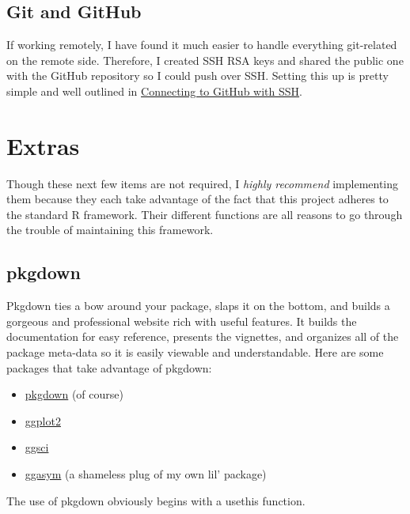 \documentclass[]{book}
\newenvironment{Shaded}{\begin{snugshade}}{\end{snugshade}}
\newcommand{\KeywordTok}[1]{\textcolor[rgb]{0.13,0.29,0.53}{\textbf{#1}}}
\newcommand{\CommentTok}[1]{\textcolor[rgb]{0.56,0.35,0.01}{\textit{#1}}}
\newcommand{\OperatorTok}[1]{\textcolor[rgb]{0.81,0.36,0.00}{\textbf{#1}}}
\newcommand{\NormalTok}[1]{#1}
\providecommand{\tightlist}{%
  \setlength{\itemsep}{0pt}\setlength{\parskip}{0pt}}
\begin{document}
\subsection{Git and GitHub}\label{git-and-github-1}

If working remotely, I have found it much easier to handle everything
git-related on the remote side. Therefore, I created SSH RSA keys and
shared the public one with the GitHub repository so I could push over
SSH. Setting this up is pretty simple and well outlined in
\href{https://help.github.com/en/articles/connecting-to-github-with-SSH}{Connecting
to GitHub with SSH}.

\section{Extras}\label{extras}

Though these next few items are not required, I \emph{highly recommend}
implementing them because they each take advantage of the fact that this
project adheres to the standard R framework. Their different functions
are all reasons to go through the trouble of maintaining this framework.

\subsection{pkgdown}\label{pkgdown}

Pkgdown ties a bow around your package, slaps it on the bottom, and
builds a gorgeous and professional website rich with useful features. It
builds the documentation for easy reference, presents the vignettes, and
organizes all of the package meta-data so it is easily viewable and
understandable. Here are some packages that take advantage of pkgdown:

\begin{itemize}
\tightlist
\item
  \href{https://pkgdown.r-lib.org}{pkgdown} (of course)
\item
  \href{https://ggplot2.tidyverse.org}{ggplot2}
\item
  \href{https://nanx.me/ggsci/}{ggsci}
\item
  \href{https://jhrcook.github.io/ggasym/index.html}{ggasym} (a
  shameless plug of my own lil' package)
\end{itemize}

The use of pkgdown obviously begins with a usethis function.

\begin{Shaded}
\end{Shaded}
\end{document}

